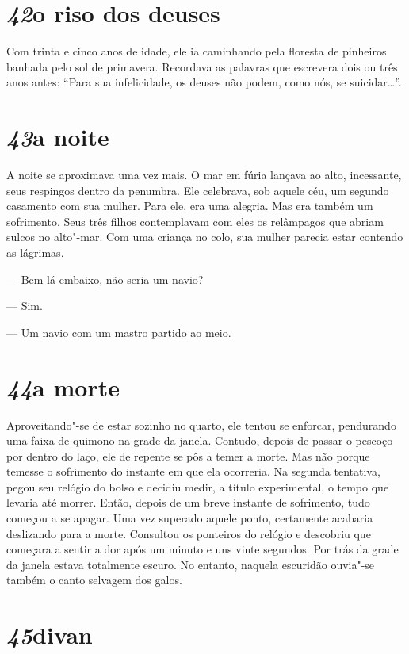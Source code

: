 \section*{\textit{42}\es o riso dos deuses}

Com trinta e cinco anos de idade, ele ia caminhando pela floresta de
pinheiros banhada pelo sol de primavera. Recordava as palavras que
escrevera dois ou três anos antes: ``Para sua infelicidade, os deuses
não podem, como nós, se suicidar\ldots{}''.

\section*{\textit{43}\es a noite}

A noite se aproximava uma vez mais. O mar em fúria lançava ao alto,
incessante, seus respingos dentro da penumbra. Ele celebrava, sob
aquele céu, um segundo casamento com sua mulher. Para ele, era uma
alegria. Mas era também um sofrimento. Seus três filhos contemplavam
com eles os relâmpagos que abriam sulcos no alto"-mar. Com uma criança
no colo, sua mulher parecia estar contendo as lágrimas.

--- Bem lá embaixo, não seria um navio?

--- Sim.

--- Um navio com um mastro partido ao meio.

\section*{\textit{44}\es a morte}

Aproveitando"-se de estar sozinho no quarto, ele tentou se enforcar,
pendurando uma faixa de quimono na grade da janela. Contudo, depois de
passar o pescoço por dentro do laço, ele de repente se pôs a temer a
morte. Mas não porque temesse o sofrimento do instante em que ela
ocorreria. Na segunda tentativa, pegou seu relógio do bolso e decidiu
medir, a título experimental, o tempo que levaria até morrer. Então,
depois de um breve instante de sofrimento, tudo começou a se apagar.
Uma vez superado aquele ponto, certamente acabaria deslizando para a
morte. Consultou os ponteiros do relógio e descobriu que começara a
sentir a dor após um minuto e uns vinte segundos. Por trás da grade da
janela estava totalmente escuro. No entanto, naquela escuridão ouvia"-se
também o canto selvagem dos galos.

\section*{\textit{45}\es divan}

